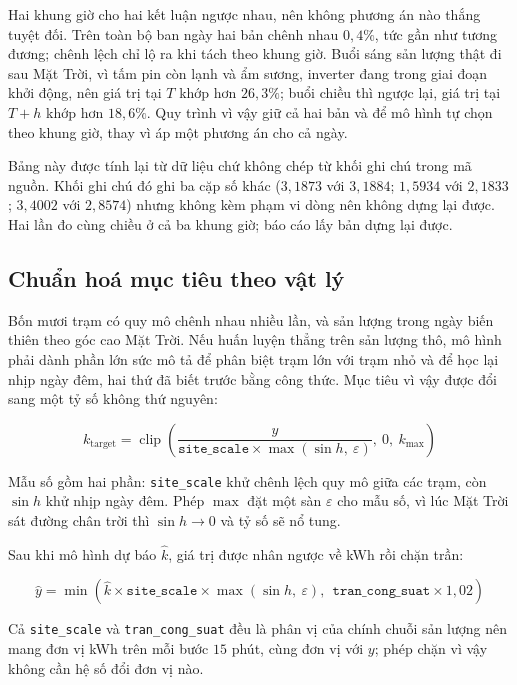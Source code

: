\documentclass[12pt, a4paper]{report}
\begin{document}
Hai khung giờ cho hai kết luận ngược nhau, nên không phương án nào thắng tuyệt đối. Trên toàn
bộ ban ngày hai bản chênh nhau $0{,}4\%$, tức gần như tương đương; chênh lệch chỉ lộ ra khi
tách theo khung giờ. Buổi sáng sản lượng thật đi sau Mặt Trời, vì tấm pin còn lạnh và
ẩm sương, inverter đang trong giai đoạn khởi động, nên giá trị tại $T$ khớp hơn $26{,}3\%$;
buổi chiều thì ngược lại, giá trị tại $T{+}h$ khớp hơn $18{,}6\%$. Quy trình vì vậy giữ cả hai
bản và để mô hình tự chọn theo khung giờ, thay vì áp một phương án cho cả ngày.

Bảng này được tính lại từ dữ liệu chứ không chép từ khối ghi chú trong mã nguồn. Khối ghi chú
đó ghi ba cặp số khác ($3{,}1873$ với $3{,}1884$; $1{,}5934$ với $2{,}1833$; $3{,}4002$ với
$2{,}8574$) nhưng không kèm phạm vi dòng nên không dựng lại được. Hai lần đo cùng chiều ở cả ba
khung giờ; báo cáo lấy bản dựng lại được.

\FloatBarrier
\subsection{Chuẩn hoá mục tiêu theo vật lý}

Bốn mươi trạm có quy mô chênh nhau nhiều lần, và sản lượng trong ngày biến thiên theo góc cao
Mặt Trời. Nếu huấn luyện thẳng trên sản lượng thô, mô hình phải dành phần lớn sức mô tả để
phân biệt trạm lớn với trạm nhỏ và để học lại nhịp ngày đêm, hai thứ đã biết trước bằng
công thức. Mục tiêu vì vậy được đổi sang một tỷ số không thứ nguyên:

\begin{equation}
k_{\text{target}} = \operatorname{clip}\!\left(
\frac{y}{\texttt{site\_scale} \times \max(\sin h,\ \varepsilon)},\ 0,\ k_{\max}\right)
\end{equation}

Mẫu số gồm hai phần: \texttt{site\_scale} khử chênh lệch quy mô giữa các trạm, còn $\sin h$ khử
nhịp ngày đêm. Phép $\max$ đặt một sàn $\varepsilon$ cho mẫu số, vì lúc Mặt Trời sát đường
chân trời thì $\sin h \to 0$ và tỷ số sẽ nổ tung.

Sau khi mô hình dự báo $\hat{k}$, giá trị được nhân ngược về kWh rồi chặn trần:

\begin{equation}
\hat{y} = \min\!\left(
\hat{k} \times \texttt{site\_scale} \times \max(\sin h,\ \varepsilon),\ \
\texttt{tran\_cong\_suat} \times 1{,}02\right)
\end{equation}

Cả \texttt{site\_scale} và \texttt{tran\_cong\_suat} đều là phân vị của chính chuỗi sản lượng nên
mang đơn vị kWh trên mỗi bước $15$ phút, cùng đơn vị với $y$; phép chặn vì vậy không cần hệ số
đổi đơn vị nào.
\end{document}
